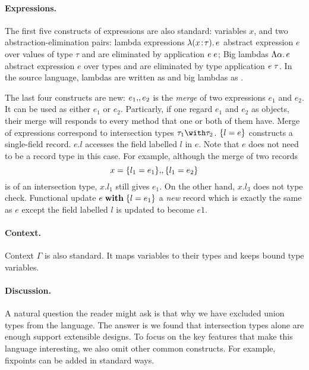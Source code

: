 \paragraph{Expressions.} The first five constructs of expressions are also
standard: variables $ x $, and two abstraction-elimination pairs: lambda
expressions $ \lambda (x \!:\! \tau).\, e $ abstract expression $ e $ over values of
type $ \tau $ and are eliminated by application $ e \; e $; Big lambdas
$ \Lambda \alpha.\, e $ abstract expression $ e $ over types and are eliminated by
type application $ e \; \tau $. In the source language, lambdas are written as
 and big lambdas as .

The last four constructs are new: $ e_1 ,\!, e_2 $ is the \emph{merge} of two
expressions $ e_1 $ and $ e_2 $.
It can be used as either $ e_1 $ or $ e_2 $. Particarly, if one regard $ e_1 $
and $ e_2 $ as objects, their merge will responds to every method that one or
both of them have. Merge of expressions correspond to intersection types
$ \tau_1 \Intersect \tau_2 $. $ \{ l = e \} $ constructs a single-field record.
$ e.l $ accesses the field labelled $ l $ in $ e $. Note that $ e $ does not
need to be a record type in this case. For example, although the merge of two
records
\[
x = \{ l_1 = e_1 \} ,\!, \{ l_1 = e_2 \} 
\]
is of an intersection type, $ x.{l_1} $ still gives $ e_1 $. On the other hand,
$ x.{l_3} $ does not type check. Functional update $ e \; \mathbf{with} \; \{l = e_1\} $ a
\emph{new} record which is exactly the same as $ e $ except the field labelled
$ l $ is updated to become $ e1 $.

\paragraph{Context.} Context $ \Gamma $ is also standard. It maps variables to
their types and keeps bound type variables.

\paragraph{Discussion.} A natural question the reader might ask is that why we
have excluded union types from the language. The answer is we found that
intersection types alone are enough support extensible designs. To focus on the
key features that make this language interesting, we also omit other common
constructs. For example, fixpoints can be added in standard ways.

